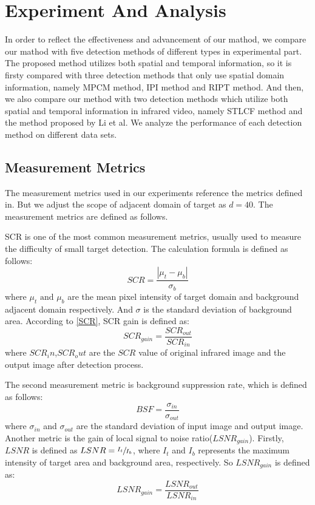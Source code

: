\documentclass[journal]{IEEEtran}
\begin{document}
\section{Experiment And Analysis}
In order to reflect the effectiveness and advancement of our mathod, we compare our mathod with five detection methods of different types in experimental part. The proposed method utilizes both spatial and temporal information, so it is firsty compared with three detection methods that only use spatial domain information, namely MPCM method\cite{wei2016multiscale}, IPI method\cite{gao2013infrared} and RIPT method\cite{dai2017reweighted}. And then, we also compare our method with two detection methods which utilize both spatial and temporal information in infrared video, namely STLCF method\cite{deng2016infrared} and the method proposed by Li et al\cite{li2016novel}. We analyze the performance of each detection method on different data sets.

\subsection{Measurement Metrics}
The measurement metrics used in our experiments reference the metrics defined in\cite{gao2013infrared}\cite{dai2017reweighted}. But we adjust the scope of adjacent domain of target as $d=40$. The measurement metrics are defined as follows.

SCR is one of the most common measurement metrics, usually used to measure the difficulty of small target detection. The calculation formula is defined as follows:
\begin{equation}
  SCR=\frac{\left| \mu_t -\mu_b \right|}{\sigma_b}
  \label{SCR}
\end{equation}
where $\mu_t \text{ and }\mu_b$ are the mean pixel intensity of target domain and background adjacent domain respectively. And $\sigma$ is the standard deviation of background area. According to \ref{SCR}, SCR gain is defined as:
\begin{equation}
  SCR_{gain}=\frac{SCR_{out}}{SCR_{in}}
\end{equation}
where $SCR_in$,$SCR_out$ are the $SCR$ value of original infrared image and the output image after detection process.

The second measurement metric is background suppression rate, which is defined as follows:
\begin{equation}
  BSF=\frac{\sigma_{in}}{\sigma_{out}}
\end{equation}
where $\sigma _{in}$ and $\sigma _{out}$ are the standard deviation of input image and output image. Another metric is the gain of local signal to noise ratio($LSNR_{gain}$). Firstly, $LSNR$ is defined as $LSNR=\sfrac{I_t}{I_b}$, where $I_t$ and $I_b$ represents the maximum intensity of target area and background area, respectively. So $LSNR_{gain}$ is defined as:
\begin{equation}
  LSNR_{gain}=\frac{LSNR_{out}}{LSNR_{in}}
\end{equation}
\end{document}
